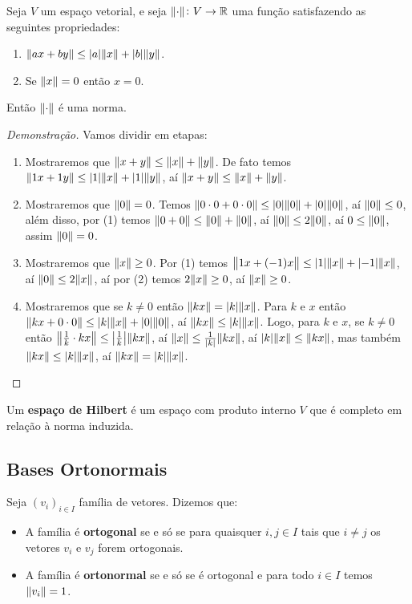 \documentclass[11pt,twoside,a4paper]{book}
\begin{document}
\begin{proposicao}
Seja $V$ um espaço vetorial, e seja $\norm{\cdot}\colon V\rightarrow\mathbb{R}$ uma função satisfazendo as seguintes propriedades:
\begin{enumerate}
    \item $\norm{ax+by}\leq\abs{a}\norm{x}+\abs{b}\norm{y}$.
    \item Se $\norm{x}=0$ então $x=0$.
\end{enumerate}
Então $\norm{\cdot}$ é uma norma.
\end{proposicao}
\begin{proof}[Demonstração]
Vamos dividir em etapas:
\begin{enumerate}
    \item Mostraremos que $\norm{x+y}\leq\norm{x}+\norm{y}$. De fato temos $\norm{1x+1y}\leq\abs{1}\norm{x}+\abs{1}\norm{y}$, aí $\norm{x+y}\leq\norm{x}+\norm{y}$.
    \item Mostraremos que $\norm{0}=0$. Temos $\norm{0\cdot0+0\cdot0}\leq\abs{0}\norm{0}+\abs{0}\norm{0}$, aí $\norm{0}\leq 0$, além disso, por (1) temos $\norm{0+0}\leq\norm{0}+\norm{0}$, aí $\norm{0}\leq2\norm{0}$, aí $0\leq\norm{0}$, assim $\norm{0}=0$.
    \item Mostraremos que $\norm{x}\geq 0$. Por (1) temos $\norm{1x+(-1)x}\leq\abs{1}\norm{x}+\abs{-1}\norm{x}$, aí $\norm{0}\leq 2\norm{x}$, aí por (2) temos $2\norm{x}\geq 0$, aí $\norm{x}\geq 0$.
    \item Mostraremos que se $k\neq 0$ então $\norm{kx}=\abs{k}\norm{x}$. Para $k$ e $x$ então $\norm{kx+0\cdot0}\leq\abs{k}\norm{x}+\abs{0}\norm{0}$, aí $\norm{kx}\leq\abs{k}\norm{x}$. Logo, para $k$ e $x$, se $k\neq 0$ então $\norm{\frac{1}{k}\cdot kx}\leq\abs{\frac{1}{k}}\norm{kx}$, aí $\norm{x}\leq\frac{1}{\abs{k}}\norm{kx}$, aí $\abs{k}\norm{x}\leq\norm{kx}$, mas também $\norm{kx}\leq\abs{k}\norm{x}$, aí $\norm{kx}=\abs{k}\norm{x}$.
\end{enumerate}
\end{proof}

\begin{definicao}
Um \textbf{espaço de Hilbert} é um espaço com produto interno $V$ que é completo em relação à norma induzida.
\end{definicao}

\subsection{Bases Ortonormais}

\begin{definicao}
Seja $(v_i)_{i\in I}$ família de vetores. Dizemos que:
\begin{itemize}
\item A família é \textbf{ortogonal} se e só se para quaisquer $i,j\in I$ tais que $i\neq j$ os vetores $v_i$ e $v_j$ forem ortogonais.
\item A família é \textbf{ortonormal} se e só se é ortogonal e para todo $i\in I$ temos $\norm{v_i}=1$.
\end{itemize}
\end{definicao}
\end{document}
